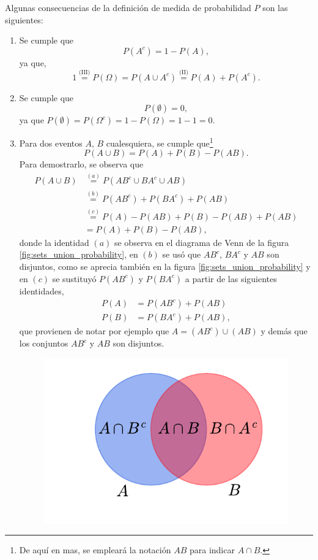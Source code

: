 \documentclass[a4paper]{report}
\begin{document}
Algunas consecuencias de la definición de medida de probabilidad \(P\) son las siguientes:
\begin{enumerate}
 \item Se cumple que
 \begin{equation}\label{complement_probability}
  P(A^c)=1-P(A),  
 \end{equation}
 ya que,
 \[
  1\overset{\textrm{(III)}}{=}P(\Omega)=P(A\cup A^c)\overset{\textrm{(II)}}{=}P(A)+P(A^c).
 \]
 \item Se cumple que
 \[
  P(\emptyset)=0,
 \]
 ya que \(P(\emptyset)=P(\Omega^c)=1-P(\Omega)=1-1=0\).
 \item Para dos eventos \(A,\,B\) cualesquiera, se cumple que\footnote{De aquí en mas, se empleará la notación \(AB\) para indicar \(A\cap B\).}
 \begin{equation}\label{eq:events_union}
  P(A\cup B) = P(A)+P(B)-P(AB).
 \end{equation}
Para demostrarlo, se observa que
 \begin{align*}
  P(A\cup B)&\overset{(a)}{=}P(AB^c\cup BA^c\cup AB)\\
   &\overset{(b)}{=}P(AB^c)+P(BA^c)+P(AB)\\
   &\overset{(c)}{=}P(A)-P(AB)+P(B)-P(AB)+P(AB)\\
   &=P(A)+P(B)-P(AB),
 \end{align*}
donde la identidad \((a)\) se observa en el diagrama de Venn de la figura \ref{fig:sets_union_probability}, en \((b)\) se usó que \(AB^c\), \(BA^c\) y \(AB\) son disjuntos, como se aprecia también en la figura \ref{fig:sets_union_probability} y en \((c)\) se sustituyó \(P(AB^c)\) y \(P(BA^c)\) a partir de las siguientes identidades, 
\begin{equation}\label{eq:events_union_tmp}
 \begin{aligned}
  P(A)&=P(AB^c)+P(AB)\\
  P(B)&=P(BA^c)+P(AB), 
 \end{aligned}
\end{equation}
 que provienen de notar por ejemplo que \(A=(AB^c)\cup(AB)\) y demás que los conjuntos \(AB^c\) y \(AB\) son disjuntos.
\begin{figure}[!htb]
  \begin{minipage}[c]{0.37\textwidth}
    \includegraphics[width=\textwidth]{figuras/sets_union_probability.pdf}

\end{minipage}
\end{figure}
\end{enumerate}
\end{document}
